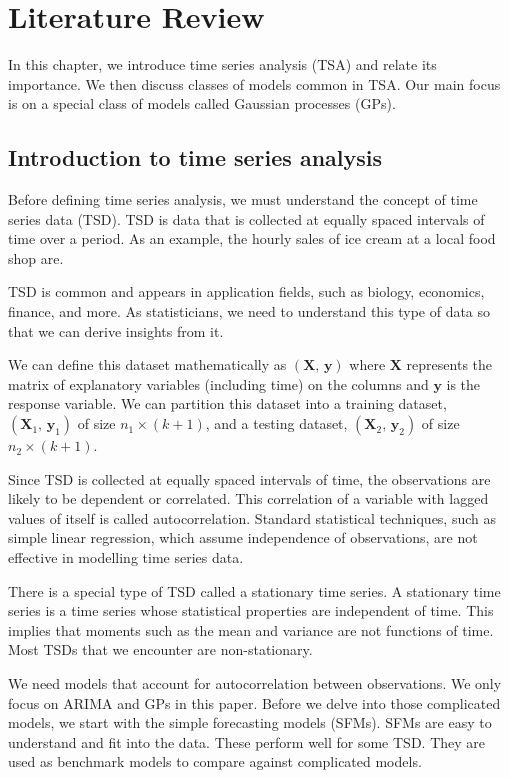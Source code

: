 \section{Literature Review}

In this chapter, we introduce time series analysis (TSA) and relate its importance. We then discuss classes of models common in TSA. Our main focus is on a special class of models called Gaussian processes (GPs).

\subsection{Introduction to time series analysis}

Before defining time series analysis, we must understand the concept of time series data (TSD). TSD is data that is collected at equally spaced intervals of time over a period. As an example, the hourly sales of ice cream at a local food shop are. 

TSD is common and appears in application fields, such as biology, economics, finance, and more. As statisticians, we need to understand this type of data so that we can derive insights from it.

We can define this dataset mathematically as \({(\mathbf{X},\, \mathbf{y})}\) where \(\mathbf{X}\) represents the matrix of explanatory variables (including time) on the columns and \(\mathbf{y}\) is the response variable. We can partition this dataset into a training dataset, \({(\mathbf{X}_{1},\, \mathbf{y}_{1})}\) of size \(n_{1} \times (k+1)\), and a testing dataset, \({(\mathbf{X}_{2},\, \mathbf{y}_{2})}\) of size \(n_{2} \times (k+1)\).

Since TSD is collected at equally spaced intervals of time, the observations are likely to be dependent or correlated. This correlation of a variable with lagged values of itself is called autocorrelation. Standard statistical techniques, such as simple linear regression, which assume independence of observations, are not effective in modelling time series data.

There is a special type of TSD called a stationary time series. A stationary time series is a time series whose statistical properties are independent of time. This implies that moments such as the mean and variance are not functions of time. Most TSDs that we encounter are non-stationary.  

We need models that account for autocorrelation between observations. We only focus on ARIMA and GPs in this paper. Before we delve into those complicated models, we start with the simple forecasting models (SFMs). SFMs are easy to understand and fit into the data. These perform well for some TSD. They are used as benchmark models to compare against complicated models. 

